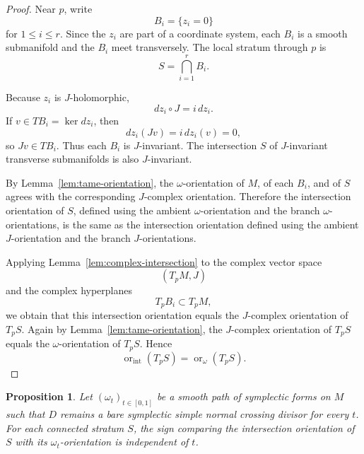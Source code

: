 \documentclass[12pt]{article}
\newtheorem{proposition}[theorem]{Proposition}
\begin{document}
\begin{proof}
Near \(p\), write
\[
B_i=\{z_i=0\}
\]
for \(1\le i\le r\). Since the \(z_i\) are part of a coordinate system, each \(B_i\) is a smooth submanifold and the \(B_i\) meet transversely. The local stratum through \(p\) is
\[
S=\bigcap_{i=1}^r B_i.
\]

Because \(z_i\) is \(J\)-holomorphic,
\[
dz_i\circ J=i\,dz_i.
\]
If \(v\in T B_i=\ker dz_i\), then
\[
dz_i(Jv)=i\,dz_i(v)=0,
\]
so \(Jv\in T B_i\). Thus each \(B_i\) is \(J\)-invariant. The intersection \(S\) of \(J\)-invariant transverse submanifolds is also \(J\)-invariant.

By Lemma~\ref{lem:tame-orientation}, the \(\omega\)-orientation of \(M\), of each \(B_i\), and of \(S\) agrees with the corresponding \(J\)-complex orientation. Therefore the intersection orientation of \(S\), defined using the ambient \(\omega\)-orientation and the branch \(\omega\)-orientations, is the same as the intersection orientation defined using the ambient \(J\)-orientation and the branch \(J\)-orientations.

Applying Lemma~\ref{lem:complex-intersection} to the complex vector space
\[
(T_pM,J)
\]
and the complex hyperplanes
\[
T_pB_i\subset T_pM,
\]
we obtain that this intersection orientation equals the \(J\)-complex orientation of \(T_pS\). Again by Lemma~\ref{lem:tame-orientation}, the \(J\)-complex orientation of \(T_pS\) equals the \(\omega\)-orientation of \(T_pS\). Hence
\[
\operatorname{or}_{\mathrm{int}}(T_pS)
=
\operatorname{or}_\omega(T_pS).
\]
\end{proof}

\begin{proposition}\label{prop:deformation}
Let \((\omega_t)_{t\in[0,1]}\) be a smooth path of symplectic forms on \(M\) such that \(D\) remains a bare symplectic simple normal crossing divisor for every \(t\). For each connected stratum \(S\), the sign comparing the intersection orientation of \(S\) with its \(\omega_t\)-orientation is independent of \(t\).
\end{proposition}
\end{document}
